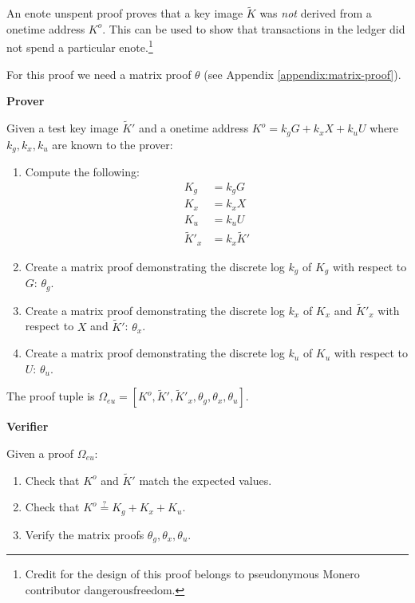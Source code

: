 \begin{appendices}
An enote unspent proof proves that a key image $\tilde{K}$ was {\em not} derived from a onetime address $K^o$. This can be used to show that transactions in the ledger did not spend a particular enote.\footnote{Credit for the design of this proof belongs to pseudonymous Monero contributor dangerousfreedom.}

For this proof we need a matrix proof $\theta$ (see Appendix \ref{appendix:matrix-proof}).

\textbf{Prover}

Given a test key image $\tilde{K}'$ and a onetime address $K^o = k_g G + k_x X + k_u U$ where $k_g, k_x, k_u$ are known to the prover:

\begin{enumerate}
    \item Compute the following:
    \begin{align*}
        K_g &= k_g G \\
        K_x &= k_x X \\
        K_u &= k_u U \\
        \tilde{K}'_x &= k_x \tilde{K}'
    \end{align*}

    \item Create a matrix proof demonstrating the discrete log $k_g$ of $K_g$ with respect to $G$: $\theta_g$.

    \item Create a matrix proof demonstrating the discrete log $k_x$ of $K_x$ and $\tilde{K}'_x$ with respect to $X$ and $\tilde{K}'$: $\theta_x$.

    \item Create a matrix proof demonstrating the discrete log $k_u$ of $K_u$ with respect to $U$: $\theta_u$.
\end{enumerate}

The proof tuple is $\Omega_{eu} = [K^o, \tilde{K}', \tilde{K}'_x, \theta_g, \theta_x, \theta_u]$.

\textbf{Verifier}

Given a proof $\Omega_{eu}$:

\begin{enumerate}
    \item Check that $K^o$ and $\tilde{K}'$ match the expected values.

    \item Check that $K^o \stackrel{?}{=} K_g + K_x + K_u$.

    \item Verify the matrix proofs $\theta_g, \theta_x, \theta_u$.


\end{enumerate}
\end{appendices}
